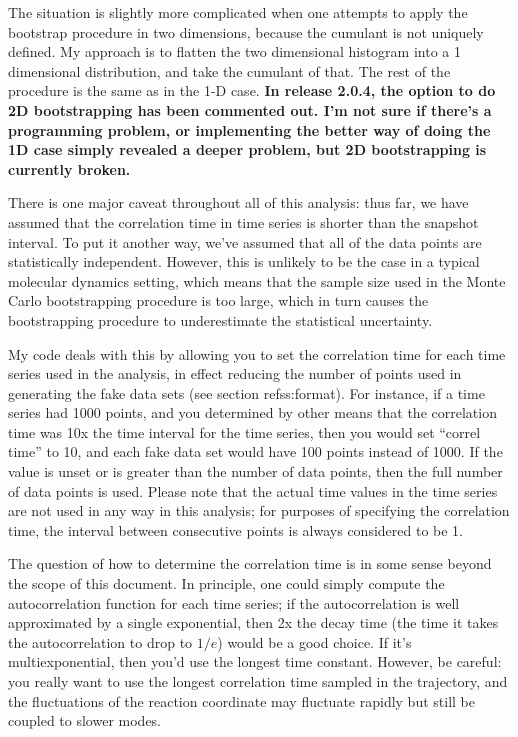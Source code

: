 \documentclass[12pt]{article}
\begin{document}
The situation is slightly more complicated when one attempts to apply the
bootstrap procedure in two dimensions, because the cumulant is not uniquely
defined.  My approach is to flatten the two dimensional histogram into a 1
dimensional distribution, and take the cumulant of that.  The rest of the
procedure is the same as in the 1-D case.  {\bf In release 2.0.4, the option
to do 2D bootstrapping has been commented out.  I'm not sure if there's a
programming problem, or implementing the better way of doing the 1D case
simply revealed a deeper problem, but 2D bootstrapping is currently broken.}

There is one major caveat throughout all of this analysis: thus far, we have
assumed that the correlation time in time series is shorter than the snapshot
interval.  To put it another way, we've assumed that all of the data points
are statistically independent.  However, this is unlikely to be the case in a
typical molecular dynamics setting, which means that the sample size used in
the Monte Carlo bootstrapping procedure is too large, which in turn causes
the bootstrapping procedure to underestimate the statistical uncertainty.  

My code deals with this by allowing you to set the correlation time for each
time series used in the analysis, in effect reducing the number of points
used in generating the fake data sets (see section ref{ss:format}).  For
instance, if a time series had 1000 points, and you determined by other means
that the correlation time was 10x the time interval for the time series, then
you would set ``correl time'' to 10, and each fake data set would have 100
points instead of 1000.  If the value is unset or is greater than the number
of data points, then the full number of data points is used.  Please note
that the actual time values in the time series are not used in any way in
this analysis; for purposes of specifying the correlation time, the interval
between consecutive points is always considered to be 1.

The question of how to determine the correlation time is in some sense beyond
the scope of this document.  In principle, one could simply compute the
autocorrelation function for each time series; if the autocorrelation is well
approximated by a single exponential, then 2x the decay time (the time it
takes the autocorrelation to drop to $1/e$) would be a good choice.  If it's
multiexponential, then you'd use the longest time constant.  However, be
careful: you really want to use the longest correlation time sampled in the
trajectory, and the fluctuations of the reaction coordinate may fluctuate
rapidly but still be coupled to slower modes.  
\end{document}
